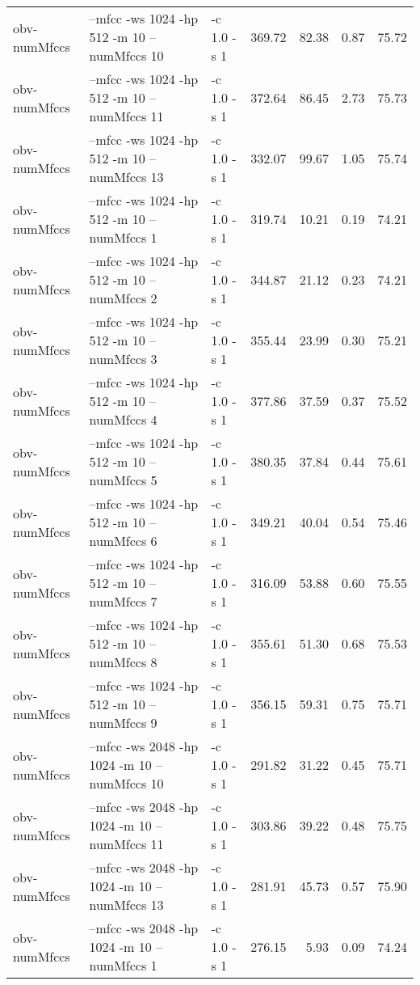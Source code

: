 \documentclass[11pt,a4paper]{article}
\begin{document}
\begin{tabular}{lllrrrr}
 obv-numMfccs  &  --mfcc -ws 1024 -hp 512 -m 10 --numMfccs 10    &  -c 1.0 -s 1  &  369.72  &    82.38  &   0.87  &  75.72  \\
 obv-numMfccs  &  --mfcc -ws 1024 -hp 512 -m 10 --numMfccs 11    &  -c 1.0 -s 1  &  372.64  &    86.45  &   2.73  &  75.73  \\
 obv-numMfccs  &  --mfcc -ws 1024 -hp 512 -m 10 --numMfccs 13    &  -c 1.0 -s 1  &  332.07  &    99.67  &   1.05  &  75.74  \\
 obv-numMfccs  &  --mfcc -ws 1024 -hp 512 -m 10 --numMfccs 1     &  -c 1.0 -s 1  &  319.74  &    10.21  &   0.19  &  74.21  \\
 obv-numMfccs  &  --mfcc -ws 1024 -hp 512 -m 10 --numMfccs 2     &  -c 1.0 -s 1  &  344.87  &    21.12  &   0.23  &  74.21  \\
 obv-numMfccs  &  --mfcc -ws 1024 -hp 512 -m 10 --numMfccs 3     &  -c 1.0 -s 1  &  355.44  &    23.99  &   0.30  &  75.21  \\
 obv-numMfccs  &  --mfcc -ws 1024 -hp 512 -m 10 --numMfccs 4     &  -c 1.0 -s 1  &  377.86  &    37.59  &   0.37  &  75.52  \\
 obv-numMfccs  &  --mfcc -ws 1024 -hp 512 -m 10 --numMfccs 5     &  -c 1.0 -s 1  &  380.35  &    37.84  &   0.44  &  75.61  \\
 obv-numMfccs  &  --mfcc -ws 1024 -hp 512 -m 10 --numMfccs 6     &  -c 1.0 -s 1  &  349.21  &    40.04  &   0.54  &  75.46  \\
 obv-numMfccs  &  --mfcc -ws 1024 -hp 512 -m 10 --numMfccs 7     &  -c 1.0 -s 1  &  316.09  &    53.88  &   0.60  &  75.55  \\
 obv-numMfccs  &  --mfcc -ws 1024 -hp 512 -m 10 --numMfccs 8     &  -c 1.0 -s 1  &  355.61  &    51.30  &   0.68  &  75.53  \\
 obv-numMfccs  &  --mfcc -ws 1024 -hp 512 -m 10 --numMfccs 9     &  -c 1.0 -s 1  &  356.15  &    59.31  &   0.75  &  75.71  \\
 obv-numMfccs  &  --mfcc -ws 2048 -hp 1024 -m 10 --numMfccs 10   &  -c 1.0 -s 1  &  291.82  &    31.22  &   0.45  &  75.71  \\
 obv-numMfccs  &  --mfcc -ws 2048 -hp 1024 -m 10 --numMfccs 11   &  -c 1.0 -s 1  &  303.86  &    39.22  &   0.48  &  75.75  \\
 obv-numMfccs  &  --mfcc -ws 2048 -hp 1024 -m 10 --numMfccs 13   &  -c 1.0 -s 1  &  281.91  &    45.73  &   0.57  &  75.90  \\
 obv-numMfccs  &  --mfcc -ws 2048 -hp 1024 -m 10 --numMfccs 1    &  -c 1.0 -s 1  &  276.15  &     5.93  &   0.09  &  74.24  \\

\end{tabular}
\end{document}
